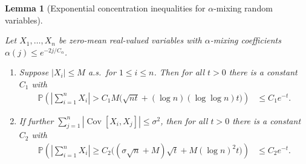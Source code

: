 \documentclass[11pt,lof]{puthesis}
\renewcommand{\P}{\ensuremath{\mathbb{P}}}
\DeclareMathOperator{\Cov}{Cov}
\theoremstyle{break}
\newtheorem{lemma}{Lemma}[section]
\theoremstyle{proof}
\begin{document}
\begin{lemma}[Exponential concentration inequalities for
  \texorpdfstring{$\alpha$}{alpha}-mixing random variables]
  \label{lem:yurinskii_app_exponential_mixing}

  Let $X_1, \ldots, X_n$ be zero-mean real-valued
  variables with $\alpha$-mixing coefficients
  $\alpha(j) \leq e^{-2 j / C_\alpha}$.

  \begin{enumerate}[label=(\roman*)]

    \item
      \label{it:yurinskii_app_exponential_mixing_bounded}
      Suppose $|X_i| \leq M$ a.s.\ for $1 \leq i \leq n$.
      Then for all $t > 0$ there is a constant $C_1$ with
      \begin{align*}
        \P\left(
          \left|
          \sum_{i=1}^n
          X_i
          \right|
          > C_1 M \big( \sqrt{n t}
          + (\log n)(\log \log n) t \big)
        \right)
        &\leq
        C_1 e^{-t}.
      \end{align*}
    \item
      \label{it:yurinskii_app_exponential_mixing_bernstein}
      If further $\sum_{j=1}^n |\Cov[X_i, X_j]| \leq \sigma^2$,
      then for all $t > 0$ there is a constant $C_2$ with
      \begin{align*}
        \P\left(
          \left|
          \sum_{i=1}^n
          X_i
          \right|
          \geq C_2 \big( (\sigma \sqrt n + M) \sqrt t
          + M (\log n)^2 t \big)
        \right)
        &\leq
        C_2 e^{-t}.
      \end{align*}

  \end{enumerate}

\end{lemma}
\end{document}
